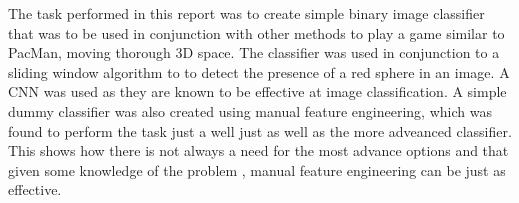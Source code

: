 \documentclass{article}
\begin{document}
The task performed in this report was to create simple binary image classifier that was to be used in conjunction with other methods to play a game similar to PacMan, moving thorough 3D space.
The classifier was used in conjunction to a sliding window algorithm to to detect the presence of a red sphere in an image.
A CNN was used as they are known to be effective at image classification.
A simple dummy classifier was also created using manual feature engineering, which was found to perform the task just a well just as well as the more adveanced classifier.
This shows how there is not always a need for the most advance options and that given some knowledge of the problem
, manual feature engineering can be just as effective.

\printbibliography
\end{document}
